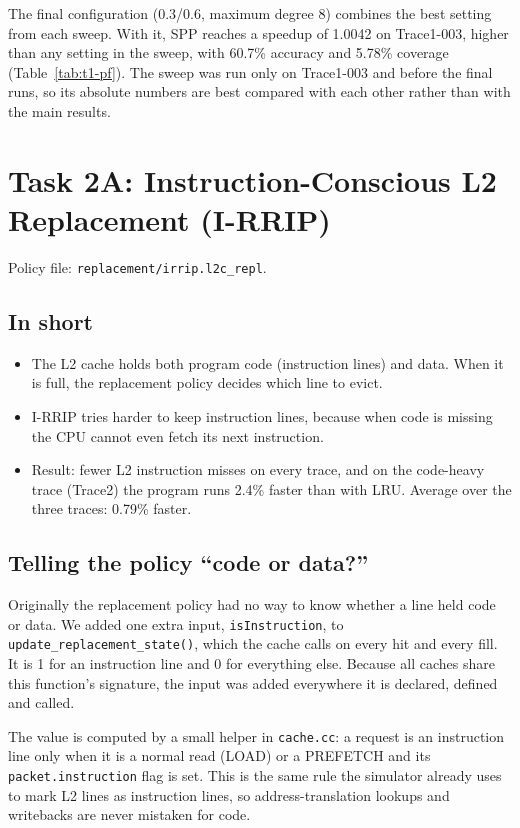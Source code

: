 \documentclass[11pt]{article}
\begin{document}
The final configuration (0.3/0.6, maximum degree 8) combines the best setting
from each sweep. With it, SPP reaches a speedup of 1.0042 on Trace1-003, higher
than any setting in the sweep, with 60.7\% accuracy and 5.78\% coverage
(Table~\ref{tab:t1-pf}). The sweep was run only on Trace1-003 and before the
final runs, so its absolute numbers are best compared with each other rather
than with the main results.


\section{Task 2A: Instruction-Conscious L2 Replacement (I-RRIP)}

Policy file: \texttt{replacement/irrip.l2c\_repl}.

\subsection{In short}
\begin{itemize}
  \item The L2 cache holds both program code (instruction lines) and data. When
        it is full, the replacement policy decides which line to evict.
  \item I-RRIP tries harder to keep instruction lines, because when code is
        missing the CPU cannot even fetch its next instruction.
  \item Result: fewer L2 instruction misses on every trace, and on the
        code-heavy trace (Trace2) the program runs 2.4\% faster than with LRU.
        Average over the three traces: 0.79\% faster.
\end{itemize}

\subsection{Telling the policy ``code or data?''}
Originally the replacement policy had no way to know whether a line held code
or data. We added one extra input, \texttt{isInstruction}, to
\texttt{update\_replacement\_state()}, which the cache calls on every hit and
every fill. It is 1 for an instruction line and 0 for everything else. Because
all caches share this function's signature, the input was added everywhere it is
declared, defined and called.

The value is computed by a small helper in \texttt{cache.cc}: a request is an
instruction line only when it is a normal read (LOAD) or a PREFETCH and its
\texttt{packet.instruction} flag is set. This is the same rule the simulator
already uses to mark L2 lines as instruction lines, so address-translation
lookups and writebacks are never mistaken for code.
\end{document}
